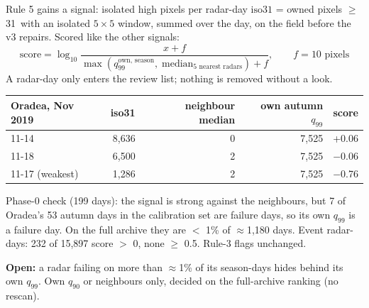 \begin{frame}{Rule 5 gains a signal: isolated high pixels per radar-day}
  \small
  $\text{iso31}$ = owned pixels $\ge$ 31\mmh\ with an isolated $5\times5$ window, summed over the
  day, on the field before the v3 repairs. Scored like the other signals:
  \[
    \text{score} = \log_{10}\frac{x + f}{\max\left(q_{99}^{\text{own, season}},\;
      \text{median}_{\text{5 nearest radars}}\right) + f}, \qquad f = 10 \text{ pixels}
  \]
  A radar-day only enters the review list; nothing is removed without a look.
  \vspace{2mm}

  \footnotesize
  \centering
  \begin{tabular}{lrrrr}
    \toprule
    Oradea, Nov 2019 & iso31 & neighbour median & own autumn $q_{99}$ & score \\
    \midrule
    11-14 & 8,636 & 0 & 7,525 & +0.06 \\
    11-18 & 6,500 & 2 & 7,525 & $-$0.06 \\
    11-17 (weakest) & 1,286 & 2 & 7,525 & $-$0.76 \\
    \bottomrule
  \end{tabular}
  \vspace{2mm}

  \raggedright\small
  Phase-0 check (199 days): the signal is strong against the neighbours, but 7 of Oradea's 53
  autumn days in the calibration set are failure days, so its own $q_{99}$ is a failure day.
  On the full archive they are $<$ 1\% of $\approx$1,180 days. Event radar-days: 232 of 15,897
  score $>$ 0, none $\ge$ 0.5. Rule-3 flags unchanged.
  \vspace{1mm}

  \textbf{Open:} a radar failing on more than $\approx$1\% of its season-days hides behind its
  own $q_{99}$. Own $q_{90}$ or neighbours only, decided on the full-archive ranking (no rescan).
\end{frame}

